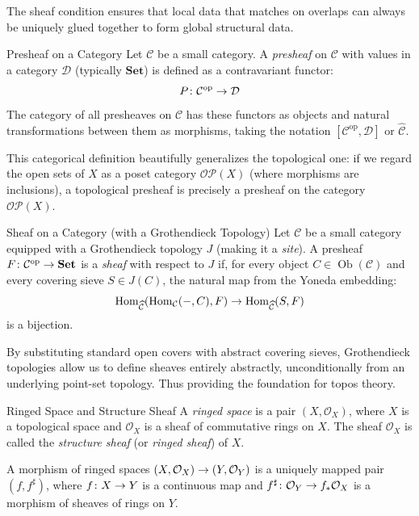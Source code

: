 \documentclass[a4paper]{article}
\begin{document}
The sheaf condition ensures that local data that matches on overlaps can always be uniquely glued together to form global structural data.

\begin{snippetdefinition}{Presheaf on a Category}
    Let \(\mathcal{C}\) be a small category. A \emph{presheaf} on \(\mathcal{C}\) with values in a category \(\mathcal{D}\) (typically \(\mathbf{Set}\)) is defined as a contravariant functor:
    \[
        P \colon \mathcal{C}^{\text{op}} \to \mathcal{D}
    \]
    The category of all presheaves on \(\mathcal{C}\) has these functors as objects and natural transformations between them as morphisms, taking the notation \([\mathcal{C}^{\text{op}}, \mathcal{D}]\) or \(\widehat{\mathcal{C}}\).
\end{snippetdefinition}

This categorical definition beautifully generalizes the topological one: if we regard the open sets of \(X\) as a poset category \(\mathcal{OP}(X)\) (where morphisms are inclusions), a topological presheaf is precisely a presheaf on the category \(\mathcal{OP}(X)\).

\begin{snippetdefinition}{Sheaf on a Category (with a Grothendieck Topology)}
    Let \(\mathcal{C}\) be a small category equipped with a Grothendieck topology \(J\) (making it a \emph{site}). A presheaf \(F \colon \mathcal{C}^{\text{op}} \to \mathbf{Set}\) is a \emph{sheaf} with respect to \(J\) if, for every object \(C \in \operatorname{Ob}(\mathcal{C})\) and every covering sieve \(S \in J(C)\), the natural map from the Yoneda embedding:
    \[
        \operatorname{Hom}_{\widehat{\mathcal{C}}}(\operatorname{Hom}_{\mathcal{C}}(-, C), F) \to \operatorname{Hom}_{\widehat{\mathcal{C}}}(S, F)
    \]
    is a bijection.
\end{snippetdefinition}

By substituting standard open covers with abstract covering sieves, Grothendieck topologies allow us to define sheaves entirely abstractly, unconditionally from an underlying point-set topology. Thus providing the foundation for topos theory.

\begin{snippetdefinition}{Ringed Space and Structure Sheaf}
    A \emph{ringed space} is a pair \((X, \mathcal{O}_X)\), where \(X\) is a topological space and \(\mathcal{O}_X\) is a sheaf of commutative rings on \(X\). The sheaf \(\mathcal{O}_X\) is called the \emph{structure sheaf} (or \emph{ringed sheaf}) of \(X\).
    
    A morphism of ringed spaces \((X, \mathcal{O}_X) \to (Y, \mathcal{O}_Y)\) is a uniquely mapped pair \((f, f^\sharp)\), where \(f \colon X \to Y\) is a continuous map and \(f^\sharp \colon \mathcal{O}_Y \to f_* \mathcal{O}_X\) is a morphism of sheaves of rings on \(Y\).
\end{snippetdefinition}
\end{document}
